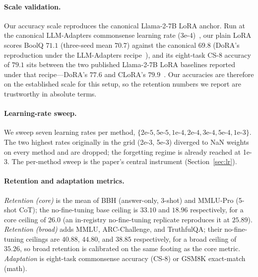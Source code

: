 \documentclass[11pt]{article}
\begin{document}
\paragraph{Scale validation.} Our accuracy scale reproduces the canonical
Llama-2-7B LoRA anchor. Run at the canonical LLM-Adapters commonsense learning rate
($3\text{e-}4$)~\citep{hu2023llmadapters}, our plain LoRA scores BoolQ $71.1$
(three-seed mean $70.7$) against the canonical $69.8$ (DoRA's reproduction under
the LLM-Adapters
recipe~\citep{liu2024dora}), and its eight-task CS-8 accuracy of $79.1$ sits
between the two published Llama-2-7B LoRA baselines reported under that
recipe---DoRA's $77.6$ and CLoRA's $79.9$~\citep{clora}. Our accuracies are
therefore on the established scale for this setup, so the retention numbers we
report are trustworthy in absolute terms.

\paragraph{Learning-rate sweep.} We sweep seven learning rates per method,
$\{2\text{e-}5, 5\text{e-}5, 1\text{e-}4, 2\text{e-}4, 3\text{e-}4, 5\text{e-}4,
1\text{e-}3\}$. The two highest rates originally in the grid (2e-3, 5e-3) diverged
to NaN weights on every method and are dropped; the forgetting regime is already
reached at 1e-3. The per-method sweep is the paper's central instrument
(Section~\ref{sec:lr}).

\paragraph{Retention and adaptation metrics.} \emph{Retention (core)} is the mean
of BBH (answer-only, 3-shot) and MMLU-Pro (5-shot CoT); the no-fine-tuning base
ceiling is $33.10$ and $18.96$ respectively, for a core ceiling of $\mathbf{26.0}$
(an in-registry no-fine-tuning replicate reproduces it at $25.89$).
\emph{Retention (broad)} adds MMLU, ARC-Challenge, and TruthfulQA; their
no-fine-tuning ceilings are $40.88$, $44.80$, and $38.85$ respectively, for a
broad ceiling of $\mathbf{35.26}$, so broad retention is calibrated on the same
footing as the core metric. \emph{Adaptation} is eight-task
commonsense accuracy (CS-8) or GSM8K exact-match (math).
\end{document}
